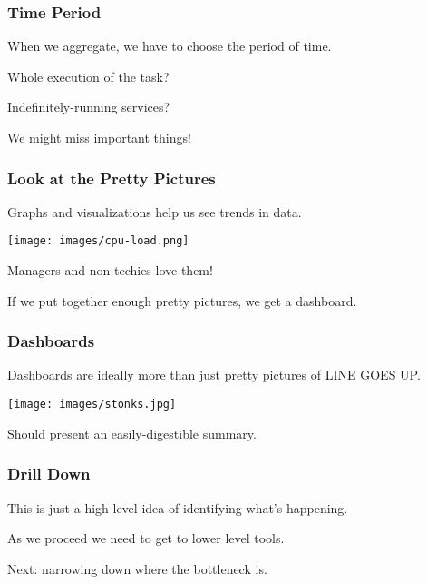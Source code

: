 \begin{frame}
\frametitle{Time Period}

When we aggregate, we have to choose the period of time.

Whole execution of the task?

Indefinitely-running services?

We might miss important things!

\end{frame}


\begin{frame}
\frametitle{Look at the Pretty Pictures}

Graphs and visualizations help us see trends in data.

\begin{center}
	\texttt{[image: images/cpu-load.png]}
\end{center}

Managers and non-techies love them!

If we put together enough pretty pictures, we get a dashboard.

\end{frame}


\begin{frame}
\frametitle{Dashboards}

Dashboards are ideally more than just pretty pictures of LINE GOES UP.

\begin{center}
	\texttt{[image: images/stonks.jpg]}
\end{center}

Should present an easily-digestible summary.

\end{frame}


\begin{frame}
\frametitle{Drill Down}

This is just a high level idea of identifying what's happening.

As we proceed we need to get to lower level tools.

Next: narrowing down where the bottleneck is.

\end{frame}








